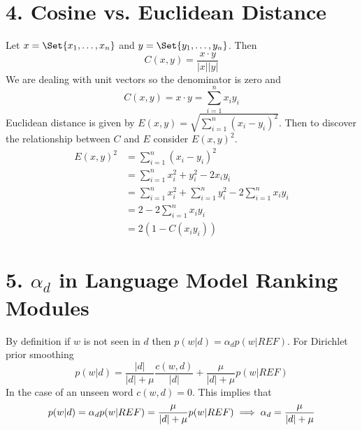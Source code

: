 \documentclass[paper=a4, fontsize=11pt]{jhwhw} %
\begin{document}
\section*{4. Cosine vs. Euclidean Distance}
\solution
Let $x = \Set{x_1, \ldots, x_n}$ and $y = \Set{y_1, \ldots, y_n}$. Then
$$C(x, y) = \frac{x\cdot y}{\lvert x\rvert \lvert y \rvert}$$
We are dealing with unit vectors so the denominator is zero and
$$C(x, y) = x \cdot y = \sum_{i = 1}^{n} x_iy_i$$
Euclidean distance is given by $E(x, y) = \sqrt{\sum_{i=1}^{n} (x_i - y_i)^2}$. Then to discover the relationship between $C$ and $E$ consider $E(x, y)^2$.
\begin{align*}
    E(x, y)^2 &= \sum_{i=1}^{n} (x_i - y_i)^2\\
              &= \sum_{i=1}^{n} x_i^2 + y_i^2 - 2x_iy_i\\
              &= \sum_{i=1}^{n} x_i^2 + \sum_{i=1}^{n}y_i^2 - 2\sum_{i=1}^{n}x_iy_i\\
              &= 2 - 2\sum_{i=1}^{n}x_iy_i\\
              &= 2(1 - C(x_iy_i))
\end{align*}
\section*{5. $\alpha_d$ in Language Model Ranking Modules}
\solution
By definition if $w$ is not seen in $d$ then $p(w|d) = \alpha_d p(w|REF)$. For Dirichlet prior smoothing 
$$p(w|d) = \frac{\lvert d\rvert}{\lvert d \rvert + \mu}\frac{c(w, d)}{\lvert d\rvert} + \frac{\mu}{\lvert d\rvert + \mu}p(w|REF)$$
In the case of an unseen word $c(w, d) = 0$. This implies that
$$p(w|d) = \alpha_d p(w|REF) = \frac{\mu}{\lvert d\rvert + \mu}p(w|REF)\\
\implies \alpha_d = \frac{\mu}{\lvert d\rvert + \mu}$$
\end{document}
